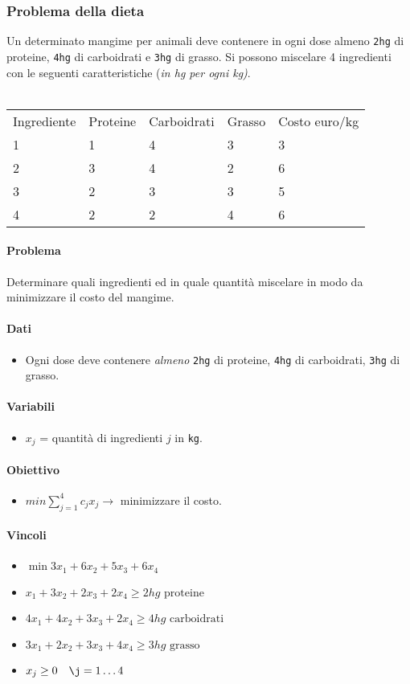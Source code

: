 \documentclass[12pt, twoside, letterpaper]{article}
\newcommand{\problemai}[5]{
	#1
	\begin{dati}
		\paragraph{Dati} 
			\begin{itemize}
				#2
			\end{itemize}
	\end{dati}
	\begin{variabili}
		\paragraph{Variabili} 
			\begin{itemize}
				#3
			\end{itemize}
	\end{variabili}
	\begin{obiettivo}
		\paragraph{Obiettivo} 
			\begin{itemize}
				#4
			\end{itemize}
	\end{obiettivo}
	\begin{vincoli}
		\paragraph{Vincoli}
			\begin{itemize}
				#5
			\end{itemize}
	\end{vincoli}
}
\begin{document}
			\subsubsection{Problema della dieta}
				\problemai{Un determinato mangime per animali deve contenere in ogni dose almeno \texttt{2hg} di proteine, \texttt{4hg} di carboidrati e \texttt{3hg} di grasso. Si possono miscelare 4 ingredienti con le seguenti caratteristiche (\textit{in hg per ogni kg)}.\\\\
				\begin{tabular}{lllll}
					Ingrediente & Proteine & Carboidrati & Grasso & Costo euro/kg\\					1 & 1 & 4 & 3 & 3\\
					2 & 3 & 4 & 2 & 6\\
					3 & 2 & 3 & 3 & 5\\
					4 & 2 & 2 & 4 & 6\\
				\end{tabular}
				\paragraph{Problema} Determinare quali ingredienti ed in quale quantità miscelare in modo da minimizzare il costo del mangime.} 
					{\item Ogni dose deve contenere \textit{almeno} \texttt{2hg} di proteine, \texttt{4hg} di carboidrati, \texttt{3hg} di grasso.}
					{\item $x_j$ = quantità di ingredienti $j$ in \texttt{kg}.}
					{\item $min \sum_{j=1}^4 c_jx_j \rightarrow$ minimizzare il costo.}
					{\item $\min 3x_1 + 6x_2 + 5x_3 + 6x_4$
					\item $x_1 + 3x_2 + 2x_3 + 2x_4 \geq 2hg \text{ proteine}$
					\item $4x_1 + 4x_2 + 3x_3 + 2x_4 \geq 4hg \text{ carboidrati}$
					\item$3x_1 + 2x_2 + 3x_3 + 4x_4 \geq 3hg \text{ grasso}$
					\item $x_j \geq 0 \quad \j = 1 \dots 4$ 
					}
		
\end{document}

